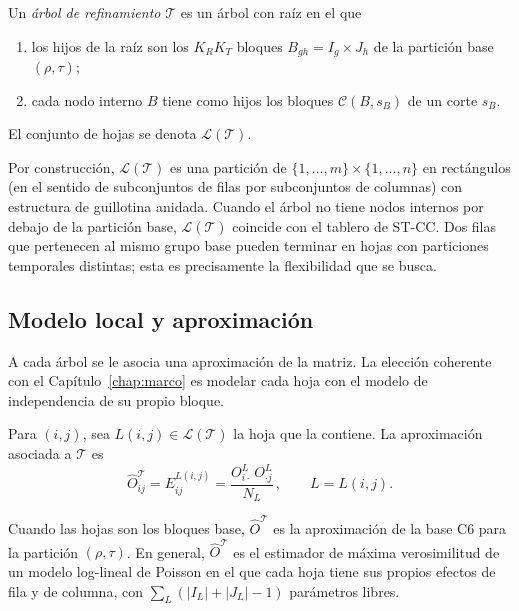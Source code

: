 \begin{definicion}\label{def:arbol}
Un \emph{árbol de refinamiento} $\mathcal{T}$ es un árbol con raíz en el que
\begin{enumerate}
  \item los hijos de la raíz son los $K_R K_T$ bloques
  $B_{gh} = I_g\times J_h$ de la partición base $(\rho,\tau)$;
  \item cada nodo interno $B$ tiene como hijos los bloques
  $\mathcal{C}(B,s_B)$ de un corte $s_B$.
\end{enumerate}
El conjunto de hojas se denota $\mathcal{L}(\mathcal{T})$.
\end{definicion}

Por construcción, $\mathcal{L}(\mathcal{T})$ es una partición de
$\{1,\dots,m\}\times\{1,\dots,n\}$ en rectángulos (en el sentido de
subconjuntos de filas por subconjuntos de columnas) con estructura de
guillotina anidada. Cuando el árbol no tiene nodos internos por debajo de la
partición base, $\mathcal{L}(\mathcal{T})$ coincide con el tablero de ST-CC.
Dos filas que pertenecen al mismo grupo base pueden terminar en hojas con
particiones temporales distintas; esta es precisamente la flexibilidad que se
busca.

\subsection{Modelo local y aproximación}

A cada árbol se le asocia una aproximación de la matriz. La elección coherente
con el Capítulo~\ref{chap:marco} es modelar cada hoja con el modelo de
independencia de su propio bloque.

\begin{definicion}\label{def:aprox-arbol}
Para $(i,j)$, sea $L(i,j)\in\mathcal{L}(\mathcal{T})$ la hoja que la contiene.
La aproximación asociada a $\mathcal{T}$ es
\[
  \hat O^{\mathcal{T}}_{ij} = E^{L(i,j)}_{ij}
  = \frac{O^{L}_{i\cdot}\, O^{L}_{\cdot j}}{N_L}\,,\qquad L = L(i,j).
\]
\end{definicion}

Cuando las hojas son los bloques base, $\hat O^{\mathcal{T}}$ es la
aproximación de la base C6 \cite{Banerjee2007} para la partición $(\rho,\tau)$.
En general, $\hat O^{\mathcal{T}}$ es el estimador de máxima verosimilitud de un
modelo log-lineal de Poisson en el que cada hoja tiene sus propios efectos de
fila y de columna, con $\sum_{L}(|I_L|+|J_L|-1)$ parámetros libres.

